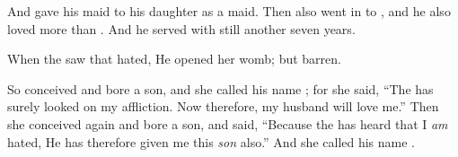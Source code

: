 \bverse And \Laban gave his maid  to his daughter \Rachel as a maid.
\bverse Then \Jacob also went in to \Rachel, and he also loved \Rachel more than \Leah. And he served with \Laban still another seven years.


\bverse When the \lord saw that \Leah \was hated, He opened her womb; but \Rachel \was barren.

\bverse So \Leah conceived and bore a son, and she called his name ; for she said, ``The \lord has surely looked on my affliction. Now therefore, my husband will love me.''
\bverse Then she conceived again and bore a son, and said, ``Because the \lord has heard that I \textit{am} hated, He has therefore given me this \textit{son} also.'' And she called his name .
\bverse 
\bverse 
